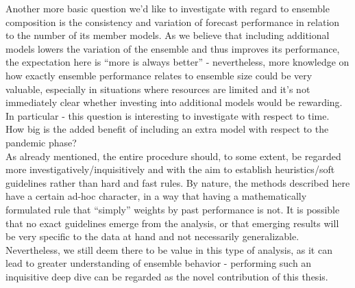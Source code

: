 Another more basic question we'd like to investigate with regard to ensemble composition is the consistency and variation of forecast performance in relation to the number of its member models. As we believe that including additional models lowers the variation of the ensemble and thus improves its performance, the expectation here is ``more is always better'' - nevertheless, more knowledge on how exactly ensemble performance relates to ensemble size could be very valuable, especially in situations where resources are limited and it's not immediately clear whether investing into additional models would be rewarding. In particular - this question is interesting to investigate with respect to time. How big is the added benefit of including an extra model with respect to the pandemic phase?\\ %
As already mentioned, the entire procedure should, to some extent, be regarded more investigatively/inquisitively and with the aim to establish heuristics/soft guidelines rather than hard and fast rules. By nature, the methods described here have a certain ad-hoc character, in a way that having a mathematically formulated rule that ``simply'' weights by past performance is not. It is possible that no exact guidelines emerge from the analysis, or that emerging results will be very specific to the data at hand and not necessarily generalizable. Nevertheless, we still deem there to be value in this type of analysis, as it can lead to greater understanding of ensemble behavior - performing such an inquisitive deep dive can be regarded as the novel contribution of this thesis.\\
